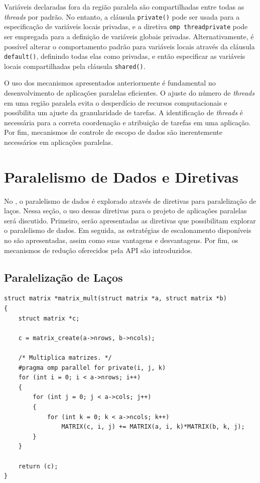 \documentclass{SBCbookchapter}
\begin{document}
		Variáveis declaradas fora da região paralela são compartilhadas
		entre todas as \textit{threads} por padrão. No entanto, a
		cláusula \texttt{private()} pode ser usada para a especificação
		de variáveis locais privadas, e a diretiva \texttt{omp
		threadprivate} pode ser empregada para a definição de variáveis
		globais privadas. Alternativamente, é possível alterar o
		comportamento padrão para variáveis locais através da cláusula
		\texttt{default()}, definindo todas elas como privadas, e então
		especificar as variáveis locais compartilhadas pela cláusula
		\texttt{shared()}.

		O uso dos mecanismos apresentados anteriormente é fundamental no
		desenvolvimento de aplicações paralelas eficientes. O ajuste do
		número de \textit{threads} em uma região paralela evita o
		desperdício de recursos computacionais e possibilita um ajuste
		da granularidade de tarefas. A identificação de \textit{threads}
		é necessária para a correta coordenação e atribuição de tarefas
		em uma aplicação. Por fim, mecanismos de controle de escopo de
		dados são inerentemente necessários em aplicações paralelas.

\section{Paralelismo de Dados e Diretivas \openmp}
\label{sec:paralelismo dados}

	No \openmp, o paralelismo de dados é explorado através de diretivas
	para paralelização de laços. Nessa seção, o uso dessas diretivas
	para o projeto de aplicações paralelas será discutido.  Primeiro,
	serão apresentadas as diretivas que possibilitam explorar o
	paralelismo de dados. Em seguida, as estratégias de escalonamento
	disponíveis no \openmp são apresentadas, assim como suas vantagens e
	desvantagens. Por fim, os mecanismos de redução oferecidos pela API
	\openmp são introduzidos.

	\subsection{Paralelização de Laços}
	\label{subsection: paralelização de lacos}

\begin{lstlisting}[frame=single,float,floatplacement=b,caption=Paralelização da multiplicação de matrizes no \openmp.,label=listing:matrixmult]
struct matrix *matrix_mult(struct matrix *a, struct matrix *b)
{
	struct matrix *c;

	c = matrix_create(a->nrows, b->ncols);

	/* Multiplica matrizes. */
	#pragma omp parallel for private(i, j, k)
	for (int i = 0; i < a->nrows; i++)
	{
		for (int j = 0; j < a->cols; j++)
		{
			for (int k = 0; k < a->ncols; k++)
				MATRIX(c, i, j) += MATRIX(a, i, k)*MATRIX(b, k, j);
		}
	}

	return (c);
}
\end{lstlisting}
\end{document}
